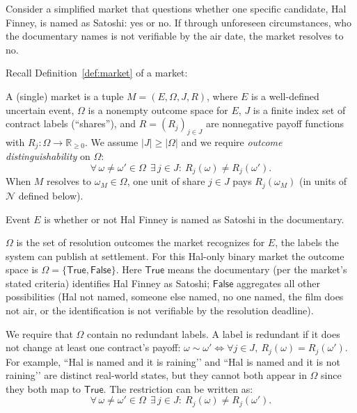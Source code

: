 Consider a simplified market that questions whether one specific candidate, \eg Hal Finney, is named as Satoshi: yes or no. If through unforeseen circumstances, who the documentary names is not verifiable by the air date, the market resolves to no.

Recall Definition~\ref{def:market} of a market: 

\begin{definition}[Market]
A (single) market is a tuple $M=(E,\Omega,J,R)$, where $E$ is a well-defined uncertain event, $\Omega$ is a nonempty outcome space for $E$, $J$ is a finite index set of contract labels (“shares”), and $R=(R_j)_{j\in J}$ are nonnegative payoff functions with $R_j:\Omega\to\mathbb{R}_{\ge 0}$. 
We assume $|J|\ge|\Omega|$ and we require \emph{outcome distinguishability} on $\Omega$:
\[
\forall\,\omega\neq\omega'\in\Omega\ \ \exists\,j\in J:\ R_j(\omega)\neq R_j(\omega').
\]
When $M$ resolves to $\omega_M\in\Omega$, one unit of share $j\in J$ pays $R_j(\omega_M)$ (in units of $\mathcal{N}$ defined below).
\end{definition}

Event $E$ is whether or not Hal Finney is named as Satoshi in the documentary.

$\Omega$ is the set of resolution outcomes the market recognizes for $E$, the labels the system can publish at settlement. For this Hal-only binary market the outcome space is $\Omega=\{\mathsf{True},\mathsf{False}\}$. Here $\mathsf{True}$ means the documentary (per the market’s stated criteria) identifies Hal Finney as Satoshi; $\mathsf{False}$ aggregates all other possibilities (Hal not named, someone else named, no one named, the film does not air, or the identification is not verifiable by the resolution deadline).


We require that $\Omega$ contain no redundant labels. A label is redundant if it does not change at least one contract’s payoff: $\omega\sim\omega' \iff \forall j\in J,\ R_j(\omega)=R_j(\omega')$. For example, “Hal is named and it is raining’’ and “Hal is named and it is not raining’’ are distinct real-world states, but they cannot both appear in $\Omega$ since they both map to $\mathsf{True}$. The restriction can be written as:
\[
\forall\,\omega\neq\omega'\in\Omega\ \ \exists\,j\in J:\ R_j(\omega)\neq R_j(\omega').
\]


